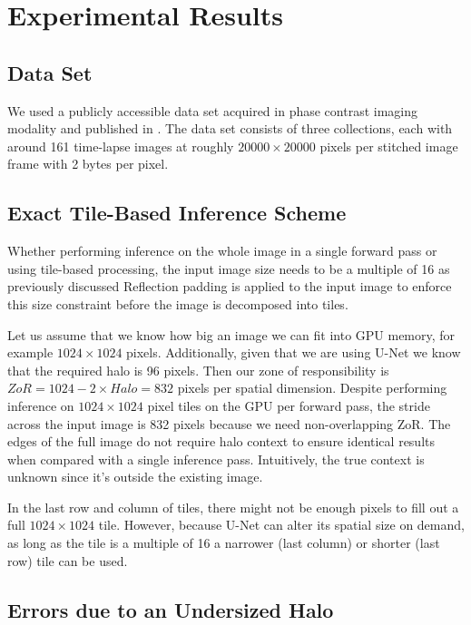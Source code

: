 \documentclass[10pt, indentfirst]{article}
\begin{document}
\section{Experimental Results}
\label{experimental-results}

\subsection{Data Set}
\label{dataset}

We used a publicly accessible data set acquired in phase contrast imaging modality and published in \citep{Bhadriraju2016}.
The data set consists of three collections, each with around 161 time-lapse images at roughly $\num{20000} \times \num{20000}$  pixels per stitched image frame with 2 bytes per pixel.


\subsection{Exact Tile-Based Inference Scheme}

Whether performing inference on the whole image in a single forward pass or using tile-based processing, the input image size needs to be a multiple of 16 as previously discussed Reflection padding is applied to the input image to enforce this size constraint before the image is decomposed into tiles.

Let us assume that we know how big an image we can fit into GPU memory, for example $1024 \times 1024$ pixels.
Additionally, given that we are using U-Net we know that the required halo is 96 pixels.
Then our zone of responsibility is $ZoR = 1024 - 2 \times Halo = 832$ pixels per spatial dimension.
Despite performing inference on $1024 \times 1024$ pixel tiles on the GPU per forward pass, the stride across the input image is 832 pixels because we need non-overlapping ZoR.
The edges of the full image do not require halo context to ensure identical results when compared with a single inference pass.
Intuitively, the true context is unknown since it's outside the existing image.

In the last row and column of tiles, there might not be enough pixels to fill out a full $1024 \times 1024$ tile.
However, because U-Net can alter its spatial size on demand, as long as the tile is a multiple of 16 a narrower (last column) or shorter (last row) tile can be used.


\subsection{Errors due to an Undersized Halo}
\end{document}
